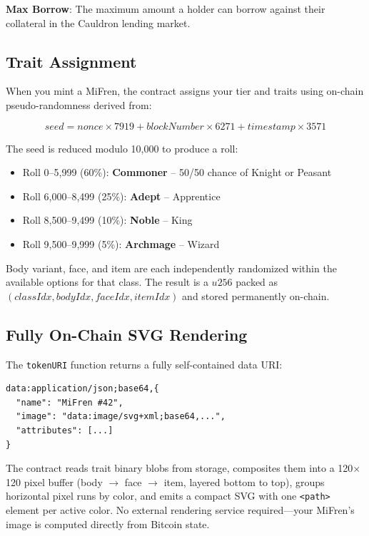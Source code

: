 \documentclass[11pt,a4paper]{article}
\begin{document}
\textbf{Max Borrow}: The maximum amount a holder can borrow against their collateral in the Cauldron lending market.

\subsection{Trait Assignment}

When you mint a MiFren, the contract assigns your tier and traits using on-chain pseudo-randomness derived from:

\begin{equation}
seed = nonce \times 7919 + blockNumber \times 6271 + timestamp \times 3571
\end{equation}

The seed is reduced modulo 10,000 to produce a roll:
\begin{itemize}
    \item Roll 0--5,999 (60\%): \textbf{Commoner} -- 50/50 chance of Knight or Peasant
    \item Roll 6,000--8,499 (25\%): \textbf{Adept} -- Apprentice
    \item Roll 8,500--9,499 (10\%): \textbf{Noble} -- King
    \item Roll 9,500--9,999 (5\%): \textbf{Archmage} -- Wizard
\end{itemize}

Body variant, face, and item are each independently randomized within the available options for that class. The result is a $u256$ packed as $(classIdx, bodyIdx, faceIdx, itemIdx)$ and stored permanently on-chain.

\subsection{Fully On-Chain SVG Rendering}

The \texttt{tokenURI} function returns a fully self-contained data URI:

\begin{verbatim}
data:application/json;base64,{
  "name": "MiFren #42",
  "image": "data:image/svg+xml;base64,...",
  "attributes": [...]
}
\end{verbatim}

The contract reads trait binary blobs from storage, composites them into a 120$\times$120 pixel buffer (body $\rightarrow$ face $\rightarrow$ item, layered bottom to top), groups horizontal pixel runs by color, and emits a compact SVG with one \texttt{<path>} element per active color. No external rendering service required---your MiFren's image is computed directly from Bitcoin state.
\end{document}
